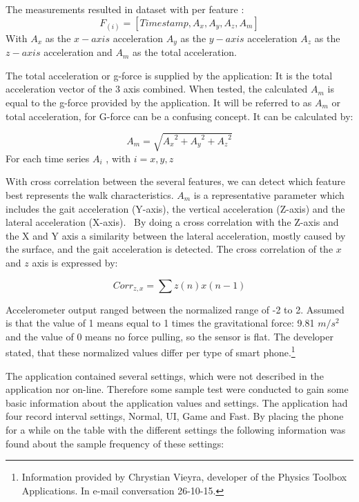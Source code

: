 The measurements resulted in dataset with per feature :
\begin{equation} 
	F_(i) = [ Time stamp, A_{x}, A_{y}, A_{z}, A_{m}] 
\end{equation}
With $A_{x}$ as the $x-axis$ acceleration
$A_{y}$ as the $y-axis$ acceleration
$A_{z}$ as the $z-axis$ acceleration and
$A_{m}$ as the total acceleration.

The total acceleration or g-force is supplied by the application: It is the total acceleration vector of the 3 axis combined. When tested, the calculated $A_{m}$ is equal to the g-force provided by the application. It will be referred to as $A_{m}$ or total acceleration, for G-force can be a confusing concept. It can be calculated by:

\begin{equation}
A_{m} = \sqrt {{A_{x}}^{2} + {A_{y}}^{2} + {A_{z}}^ {2}}
\end{equation} For each time series $A_{i}$ , with $i = {x, y, z}$ 

With cross correlation between the several features, we can detect which feature best represents the walk characteristics. $A_{m}$ is a representative parameter which includes the gait acceleration (Y-axis), the vertical acceleration (Z-axis) and the lateral acceleration (X-axis).~\cite{Weiss2014} By doing a cross correlation with the Z-axis and the X and Y axis a similarity between the lateral acceleration, mostly caused by the surface, and the gait acceleration is detected. The cross correlation of the $x$ and $z$ axis is expressed by:

\begin{equation}
Corr_{z,x} = \sum z(n)x(n-1) %
\end{equation}

Accelerometer output ranged between the normalized range of -2 to 2. Assumed is that the value of 1 means equal to 1 times the gravitational force: 9.81 $m/s^2$ and the value of 0 means no force pulling, so the sensor is flat. The developer stated, that these normalized values differ per type of smart phone.\footnote{Information provided by Chrystian Vieyra, developer of the Physics Toolbox Applications. In e-mail conversation 26-10-15. }

The application contained several settings, which were not described in the application nor on-line. Therefore some sample test were conducted to gain some basic information about the application values and settings. The application had four record interval settings, Normal, UI, Game and Fast. By placing the phone for a while on the table with the different settings the following information was found about the sample frequency of these settings: 

